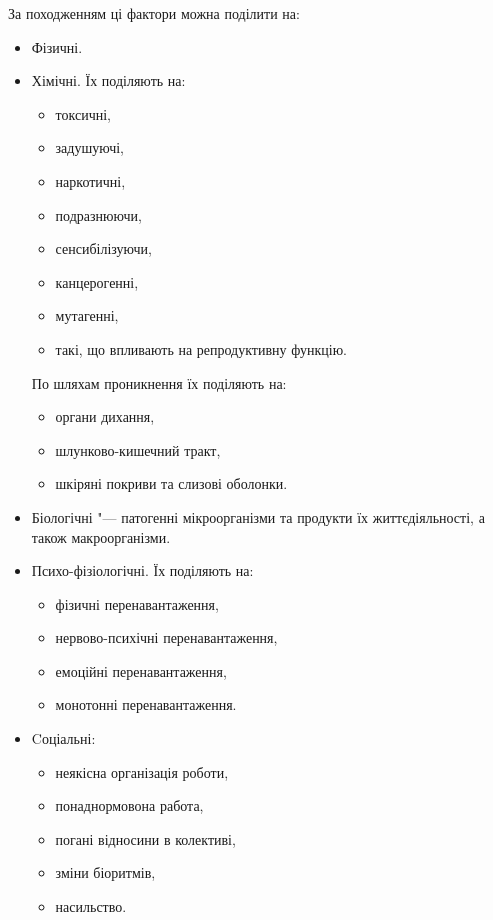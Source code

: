 \documentclass[a4paper,10pt,notitlepage,pdftex,headsepline]{scrartcl}
\begin{document}
  За походженням ці фактори можна поділити на:
  \begin{itemize}
    \item Фізичні.
    \item Хімічні.
      Їх поділяють на:
      \begin{itemize}
        \item токсичні,
        \item задушуючі,
        \item наркотичні,
        \item подразнюючи,
        \item сенсибілізуючи,
        \item канцерогенні,
        \item мутагенні,
        \item такі, що впливають на репродуктивну функцію.
      \end{itemize}

      По шляхам проникнення їх поділяють на:
      \begin{itemize}
        \item органи дихання,
        \item шлунково-кишечний тракт,
        \item шкіряні покриви та слизові оболонки.
      \end{itemize}
    \item Біологічні "--- патогенні мікроорганізми та продукти їх
      життєдіяльності, а також макроорганізми.
    \item Психо-фізіологічні.
      Їх поділяють на:
      \begin{itemize}
        \item фізичні перенавантаження,
        \item нервово-психічні перенавантаження,
        \item емоційні перенавантаження,
        \item монотонні перенавантаження.
      \end{itemize}
    \item Cоціальні:
      \begin{itemize}
        \item неякісна організація роботи,
        \item понаднормовона работа,
        \item погані відносини в колективі,
        \item зміни біоритмів,
        \item насильство.
      \end{itemize}
  \end{itemize}
\end{document}
